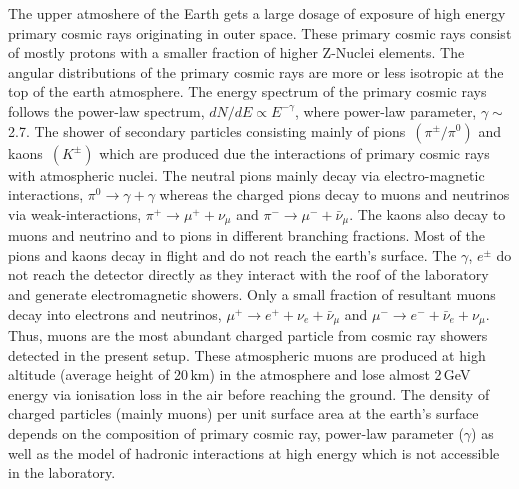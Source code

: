 The upper atmoshere of the Earth gets a large dosage of exposure of
high energy primary cosmic rays originating in outer space. These
primary cosmic rays consist of mostly protons with a smaller fraction
of higher \mbox{Z-Nuclei} elements\cite{cosmic1}. The angular
distributions of the primary cosmic rays are more or less isotropic
at the top of the earth atmosphere. The energy spectrum of the primary
cosmic rays follows the power-law spectrum, $dN/dE \propto E^{-\gamma}$,
where power-law parameter, $\gamma \sim $ 2.7. The shower of secondary
particles consisting mainly of
\mbox{pions $\left(\pi^{\pm}/\pi^0\right)$} and
\mbox{kaons $\left(K^{\pm}\right)$} which are produced due the
interactions of primary cosmic rays with atmospheric nuclei.
The neutral pions mainly decay via electro-magnetic interactions,
$\pi^0 \rightarrow \gamma+\gamma$ whereas the charged pions decay to
muons and neutrinos via weak-interactions,
$\pi^+ \rightarrow \mu^+ + \nu_{\mu}$ and
$\pi^- \rightarrow \mu^- + \bar{\nu}_{\mu}$. The kaons also decay to
muons and neutrino and to pions in different branching fractions.
Most of the pions and kaons decay in flight and do not reach the
earth's surface.
The $\gamma$, $e^{\pm}$ do not reach the detector directly as they
interact with the roof of the laboratory and generate electromagnetic
showers. Only a small fraction of resultant muons decay into
electrons and neutrinos, 
$\mu^+ \rightarrow e^+ + \nu_{e} + \bar{\nu}_{\mu}$ and 
$\mu^- \rightarrow e^- + \bar{\nu}_{e} + \nu_{\mu}$. Thus, muons are the
most abundant charged particle from cosmic ray showers detected in the
present setup. These atmospheric muons are produced at high altitude
(average height of 20\,km) in the atmosphere and lose almost 2\,GeV
energy via ionisation loss in the air before reaching the ground. The 
density of charged particles (mainly muons) per unit surface area at
the earth's surface depends on the composition of primary cosmic ray,
power-law parameter ($\gamma$) as well as the model of hadronic
interactions at high energy which is not accessible in the laboratory.
